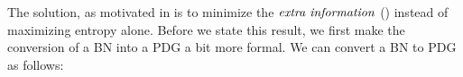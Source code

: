 \documentclass{article}
\numberwithin{equation}{section}
\begin{document}
{%
	The solution, as motivated in  is to minimize
        the $\emph{extra information}$ () instead of
        maximizing entropy alone. Before we state this result, we
        first make the conversion of a BN into a PDG a bit more
        formal.
        }
We can convert a BN to PDG as follows:
	
\end{document}
